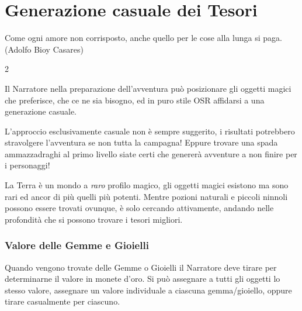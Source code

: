 \section{Generazione casuale dei Tesori}\label{generazionetesorimagici}\hypertarget{generazionetesorimagici}{}

\begin{enfasi}
{Come ogni amore non corrisposto, anche quello per le cose alla lunga si paga. (Adolfo Bioy Casares)}
\end{enfasi}

\begin{multicols}{2}

Il Narratore nella preparazione dell'avventura può posizionare gli oggetti magici che preferisce, che ce ne sia bisogno, ed in puro stile OSR affidarsi a una generazione casuale.

L'approccio esclusivamente casuale non è sempre suggerito, i risultati potrebbero stravolgere l'avventura se non tutta la campagna!
Eppure trovare una spada ammazzadraghi al primo livello siate certi che genererà avventure a non finire per i personaggi!

\begin{giocatore}[Tessssori!]
La Terra è un mondo a \emph{raro} profilo magico, gli oggetti magici esistono ma sono rari ed ancor di più quelli più potenti. Mentre pozioni naturali e piccoli ninnoli possono essere trovati ovunque, è solo cercando attivamente, andando nelle profondità che si possono trovare i tesori migliori.
\end{giocatore}

\subsubsection{Valore delle Gemme e Gioielli}\hypertarget{valoredellegemme}{}\label{valoredellegemme}\hypertarget{valoredeigioielli}{}\label{valoredeigioielli}

Quando vengono trovate delle Gemme o Gioielli il Narratore deve tirare per determinarne il valore in monete d'oro. Si può assegnare a tutti gli oggetti lo stesso valore, assegnare un valore individuale a ciascuna gemma/gioiello, oppure tirare casualmente per ciascuno.

\medskip

\setlength{\parindent}{0cm}{

}
\end{multicols}
